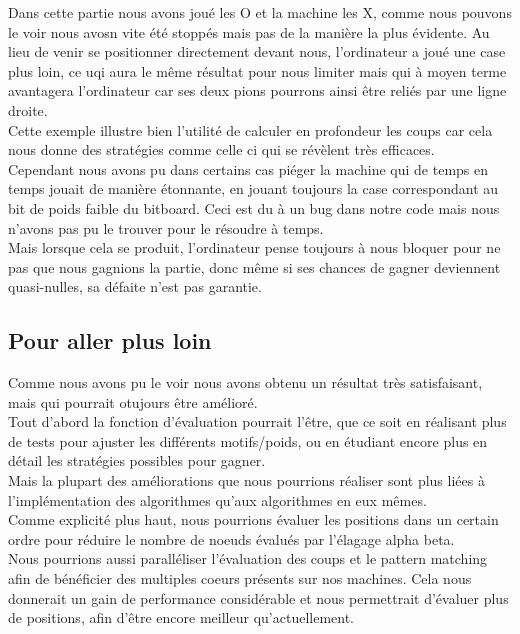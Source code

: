 \documentclass{article}
\begin{document}
Dans cette partie nous avons joué les O et la machine les X, comme nous pouvons le voir nous avosn vite été stoppés mais pas
de la manière la plus évidente.
Au lieu de venir se positionner directement devant nous, l'ordinateur a joué une case plus loin, ce uqi aura le même résultat 
pour nous limiter mais qui à moyen terme avantagera l'ordinateur car ses deux pions pourrons ainsi être reliés par une ligne droite.\\
Cette exemple illustre bien l'utilité de calculer en profondeur les coups car cela nous donne des stratégies comme celle ci qui se révèlent
très efficaces.\\

Cependant nous avons pu dans certains cas piéger la machine qui de temps en temps jouait de manière étonnante, en jouant toujours la case
correspondant au bit de poids faible du bitboard. Ceci est du à un bug dans notre code mais nous n'avons pas pu le trouver pour le résoudre à temps.\\
Mais lorsque cela se produit, l'ordinateur pense toujours à nous bloquer pour ne pas que nous gagnions la partie, donc même si ses chances de gagner
deviennent quasi-nulles, sa défaite n'est pas garantie.\\

\pagebreak
\subsection{Pour aller plus loin}

Comme nous avons pu le voir nous avons obtenu un résultat très satisfaisant, mais qui pourrait otujours être amélioré.\\
Tout d'abord la fonction d'évaluation pourrait l'être, que ce soit en réalisant plus de tests pour ajuster les différents motifs/poids,
ou en étudiant encore plus en détail les stratégies possibles pour gagner.\\

Mais la plupart des améliorations que nous pourrions réaliser sont plus liées à l'implémentation des algorithmes qu'aux algorithmes en eux mêmes.\\
Comme explicité plus haut, nous pourrions évaluer les positions dans un certain ordre pour réduire le nombre de noeuds évalués par l'élagage alpha
beta.\\
Nous pourrions aussi paralléliser l'évaluation des coups et le pattern matching afin de bénéficier des multiples coeurs présents sur nos machines.
Cela nous donnerait un gain de performance considérable et nous permettrait d'évaluer plus de positions, afin d'être encore meilleur qu'actuellement.\\
\end{document}
